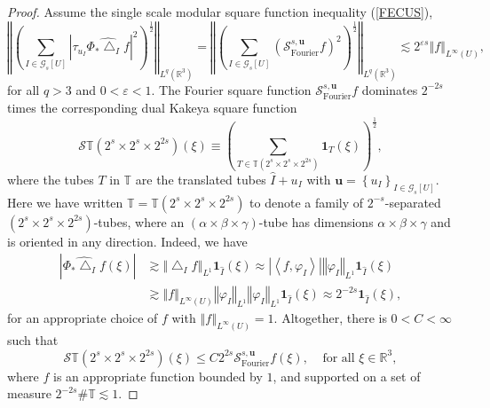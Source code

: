 \documentclass{amsart}%
\theoremstyle{plain}
\numberwithin{equation}{section}
\begin{document}
\begin{proof}
Assume the single scale modular square function inequality (\ref{FECUS}),%
\[
\left\Vert \left(  \sum_{I\in\mathcal{G}_{s}\left[  U\right]  }\left\vert
\tau_{u_{I}}\widehat{\Phi_{\ast}\bigtriangleup_{I}f}\right\vert ^{2}\right)
^{\frac{1}{2}}\right\Vert _{L^{q}\left(  \mathbb{R}^{3}\right)  }=\left\Vert
\left(  \sum_{I\in\mathcal{G}_{s}\left[  U\right]  }\left(  \mathcal{S}%
_{\operatorname*{Fourier}}^{s,\mathbf{u}}f\right)  ^{2}\right)  ^{\frac{1}{2}%
}\right\Vert _{L^{q}\left(  \mathbb{R}^{3}\right)  }\lesssim2^{\varepsilon
s}\left\Vert f\right\Vert _{L^{\infty}\left(  U\right)  },
\]
for all $q>3$ and $0<\varepsilon<1$. The Fourier square function
$\mathcal{S}_{\operatorname*{Fourier}}^{s,\mathbf{u}}f$ dominates $2^{-2s}$
times the corresponding dual Kakeya square function
\[
\mathcal{S}\mathbb{T}\left(  2^{s}\times2^{s}\times2^{2s}\right)  \left(
\xi\right)  \equiv\left(  \sum_{T\in\mathbb{T}\left(  2^{s}\times2^{s}%
\times2^{2s}\right)  }\mathbf{1}_{T}\left(  \xi\right)  \right)  ^{\frac{1}%
{2}},
\]
where the tubes $T$ in $\mathbb{T}$ are the translated tubes $\widehat
{I}+u_{I}$ with $\mathbf{u}=\left\{  u_{I}\right\}  _{I\in\mathcal{G}%
_{s}\left[  U\right]  }$. Here we have written $\mathbb{T}=\mathbb{T}\left(
2^{s}\times2^{s}\times2^{2s}\right)  $ to denote a family of $2^{-s}%
$-separated $\left(  2^{s}\times2^{s}\times2^{2s}\right)  $-tubes, where an
$\left(  \alpha\times\beta\times\gamma\right)  $-tube has dimensions
$\alpha\times\beta\times\gamma$ and is oriented in any direction. Indeed, we
have%
\begin{align*}
\left\vert \widehat{\Phi_{\ast}\bigtriangleup_{I}f}\left(  \xi\right)
\right\vert  &  \gtrsim\left\Vert \bigtriangleup_{I}f\right\Vert _{L^{1}%
}\mathbf{1}_{\widehat{I}}\left(  \xi\right)  \approx\left\vert \left\langle
f,\varphi_{I}\right\rangle \right\vert \left\Vert \varphi_{I}\right\Vert
_{L^{1}}\mathbf{1}_{\widehat{I}}\left(  \xi\right) \\
&  \gtrsim\left\Vert f\right\Vert _{L^{\infty}\left(  U\right)  }\left\Vert
\varphi_{I}\right\Vert _{L^{1}}\left\Vert \varphi_{I}\right\Vert _{L^{1}%
}\mathbf{1}_{\widehat{I}}\left(  \xi\right)  \approx2^{-2s}\mathbf{1}%
_{\widehat{I}}\left(  \xi\right)  ,
\end{align*}
for an appropriate choice of $f$ with $\left\Vert f\right\Vert _{L^{\infty
}\left(  U\right)  }=1$. Altogether, there is $0<C<\infty$ such that%
\begin{equation}
\mathcal{S}\mathbb{T}\left(  2^{s}\times2^{s}\times2^{2s}\right)  \left(
\xi\right)  \leq C2^{2s}\mathcal{S}_{\operatorname*{Fourier}}^{s,\mathbf{u}%
}f\left(  \xi\right)  ,\ \ \ \ \ \text{for all }\xi\in\mathbb{R}^{3},
\label{square point}%
\end{equation}
where $f$ is an appropriate function bounded by $1$, and supported on a set of
measure $2^{-2s}\#\mathbb{T}\lesssim1$.


\end{proof}
\end{document}
